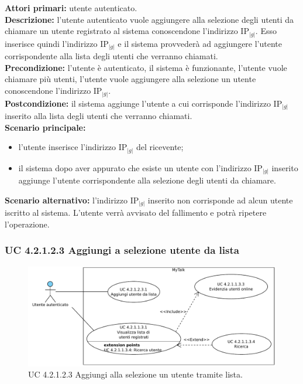 \noindent\textbf{Attori primari:} utente autenticato.\\
\textbf{Descrizione:} l'utente autenticato vuole aggiungere alla selezione degli utenti da chiamare un utente registrato al sistema conoscendone l'indirizzo IP$_{|g|}$. Esso inserisce quindi l'indirizzo IP$_{|g|}$ e il sistema provvederà ad aggiungere l'utente corrispondente alla lista degli utenti che verranno chiamati.\\
\textbf{Precondizione:} l'utente è autenticato, il sistema è funzionante, l'utente vuole chiamare più utenti, l'utente vuole aggiungere alla selezione un utente conoscendone l'indirizzo IP$_{|g|}$.\\
\textbf{Postcondizione:} il sistema aggiunge l'utente a cui corrisponde l'indirizzo IP$_{|g|}$ inserito alla lista degli utenti che verranno chiamati.\\
\textbf{Scenario principale:}
\begin{itemize}
\item l'utente inserisce l'indirizzo IP$_{|g|}$ del ricevente;
\item il sistema dopo aver appurato che esiste un utente con l'indirizzo IP$_{|g|}$ inserito aggiunge l'utente corrispondente alla selezione degli utenti da chiamare.
\end{itemize}
\textbf{Scenario alternativo:} l'indirizzo IP$_{|g|}$ inserito non corrisponde ad alcun utente iscritto al sistema. L'utente verrà avvisato del fallimento e potrà ripetere l'operazione.

\subsubsection{UC 4.2.1.2.3 Aggiungi a selezione utente da lista}

\begin{figure}[htbp]
\centering
\includegraphics[scale=0.7]{./casi_uso/UC4-2-1-2-3.pdf}
\caption{UC 4.2.1.2.3 Aggiungi alla selezione un utente tramite lista.}
\end{figure}

